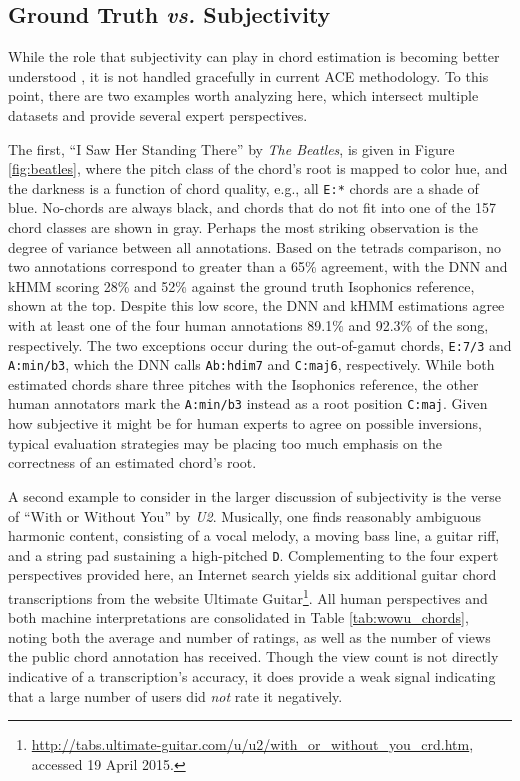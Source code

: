 \documentclass{article}
\begin{document}
\subsection{Ground Truth \emph{vs.} Subjectivity}

While the role that subjectivity can play in chord estimation is becoming better understood \cite{Ni2013Understanding}, it is not handled gracefully in current ACE methodology.
To this point, there are two examples worth analyzing here, which intersect multiple datasets and provide several expert perspectives.

The first, ``I Saw Her Standing There'' by \emph{The Beatles}, is given in Figure \ref{fig:beatles}, where the pitch class of the chord's root is mapped to color hue, and the darkness is a function of chord quality, e.g., all \texttt{E:*} chords are a shade of blue.
No-chords are always black, and chords that do not fit into one of the 157 chord classes are shown in gray.
Perhaps the most striking observation is the degree of variance between all annotations.
Based on the tetrads comparison, no two annotations correspond to greater than a 65\% agreement, with the DNN and kHMM scoring 28\% and 52\% against the ground truth Isophonics reference, shown at the top.
Despite this low score, the DNN and kHMM estimations agree with at least one of the four human annotations 89.1\% and 92.3\% of the song, respectively.
The two exceptions occur during the out-of-gamut chords, \texttt{E:7/3} and \texttt{A:min/b3}, which the DNN calls \texttt{Ab:hdim7} and \texttt{C:maj6}, respectively.
While both estimated chords share three pitches with the Isophonics reference, the other human annotators mark the \texttt{A:min/b3} instead as a root position \texttt{C:maj}.
Given how subjective it might be for human experts to agree on possible inversions, typical evaluation strategies may be placing too much emphasis on the correctness of an estimated chord's root.

A second example to consider in the larger discussion of subjectivity is the verse of ``With or Without You'' by \emph{U2}.
Musically, one finds reasonably ambiguous harmonic content, consisting of a vocal melody, a moving bass line, a guitar riff, and a string pad sustaining a high-pitched \texttt{D}.
Complementing to the four expert perspectives provided here, an Internet search yields six additional guitar chord transcriptions from the website Ultimate Guitar\footnote{\url{http://tabs.ultimate-guitar.com/u/u2/with_or_without_you_crd.htm},  accessed 19 April 2015.}.
All human perspectives and both machine interpretations are consolidated in Table \ref{tab:wowu_chords}, noting both the average and number of ratings, as well as the number of views the public chord annotation has received.
Though the view count is not directly indicative of a transcription's accuracy, it does provide a weak signal indicating that a large number of users did \emph{not} rate it negatively.
\end{document}
